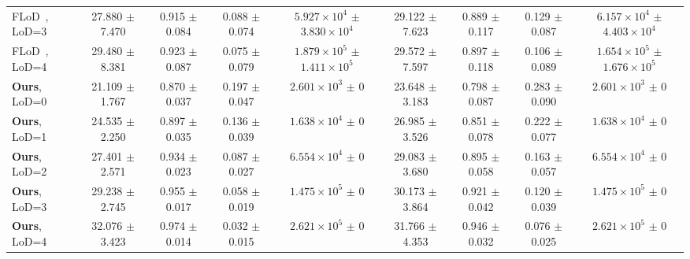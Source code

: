 {\begin{tabular}{lcccccccc}
    FLoD~\cite{seo2024flod}, LoD=3        & 27.880 $\pm$ 7.470                                    & 0.915 $\pm$ 0.084                              & 0.088 $\pm$ 0.074  & $5.927 {\times} 10^{4}$ $\pm$ $3.830 {\times} 10^{4}$ & 29.122 $\pm$ 7.623 & 0.889 $\pm$ 0.117 & 0.129 $\pm$ 0.087  & $6.157 {\times} 10^{4}$ $\pm$ $4.403 {\times} 10^{4}$ \\
    FLoD~\cite{seo2024flod}, LoD=4        & 29.480 $\pm$ 8.381                                    & 0.923 $\pm$ 0.087                              & 0.075 $\pm$ 0.079  & $1.879 {\times} 10^{5}$ $\pm$ $1.411 {\times} 10^{5}$ & 29.572 $\pm$ 7.597 & 0.897 $\pm$ 0.118 & 0.106 $\pm$ 0.089  & $1.654 {\times} 10^{5}$ $\pm$ $1.676 {\times} 10^{5}$ \\
    \midrule
    \textbf{Ours}, LoD=0                  & 21.109 $\pm$ 1.767                                    & 0.870 $\pm$ 0.037                              & 0.197 $\pm$ 0.047  & $2.601{\times} 10^3$ $\pm$ $0$                        & 23.648 $\pm$ 3.183 & 0.798 $\pm$ 0.087 & 0.283 $\pm$ 0.090  & $2.601{\times} 10^3$ $\pm$ $0$                        \\
    \textbf{Ours}, LoD=1                  & 24.535 $\pm$ 2.250                                    & 0.897 $\pm$ 0.035                              & 0.136 $\pm$ 0.039  & $1.638 {\times} 10^{4}$ $\pm$ $0$                     & 26.985 $\pm$ 3.526 & 0.851 $\pm$ 0.078 & 0.222 $\pm$ 0.077  & $1.638 {\times} 10^{4}$ $\pm$ $0$                     \\
    \textbf{Ours}, LoD=2                  & 27.401 $\pm$ 2.571                                    & 0.934 $\pm$ 0.023                              & 0.087 $\pm$ 0.027  & $6.554 {\times} 10^{4}$ $\pm$ $0$                     & 29.083 $\pm$ 3.680 & 0.895 $\pm$ 0.058 & 0.163 $\pm$ 0.057  & $6.554 {\times} 10^{4}$ $\pm$ $0$                     \\
    \textbf{Ours}, LoD=3                  & 29.238 $\pm$ 2.745                                    & 0.955 $\pm$ 0.017                              & 0.058 $\pm$ 0.019  & $1.475 {\times} 10^{5}$ $\pm$ $0$                     & 30.173 $\pm$ 3.864 & 0.921 $\pm$ 0.042 & 0.120 $\pm$ 0.039  & $1.475 {\times} 10^{5}$ $\pm$ $0$                     \\
    \textbf{Ours}, LoD=4                  & 32.076 $\pm$ 3.423                                    & 0.974 $\pm$ 0.014                              & 0.032 $\pm$ 0.015  & $2.621 {\times} 10^{5}$ $\pm$ $0$                     & 31.766 $\pm$ 4.353 & 0.946 $\pm$ 0.032 & 0.076 $\pm$ 0.025  & $2.621 {\times} 10^{5}$ $\pm$ $0$                     \\
    \bottomrule
  \end{tabular}

}

